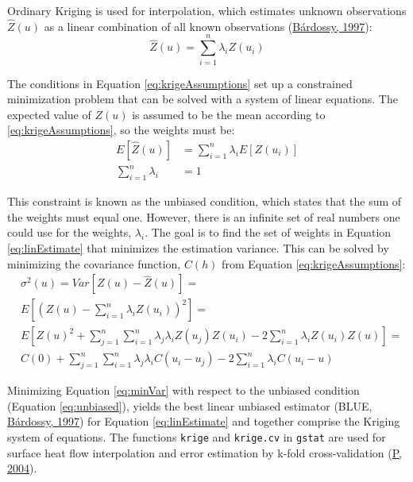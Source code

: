 Ordinary Kriging is used for interpolation, which estimates unknown observations \(\hat{Z}(u)\) as a linear combination of all known observations (\protect\hyperlink{ref-bardossy1997}{Bárdossy, 1997}):
\begin{equation}
  \hat{Z}(u) = \sum_{i=1}^n \lambda_i Z(u_i)
  \label{eq:linEstimate}
\end{equation}

The conditions in Equation \eqref{eq:krigeAssumptions} set up a constrained minimization problem that can be solved with a system of linear equations. The expected value of \(Z(u)\) is assumed to be the mean according to \eqref{eq:krigeAssumptions}, so the weights must be:
\begin{equation}
  \begin{aligned}
    E[\hat{Z}(u)] &= \sum_{i=1}^n \lambda_i E[Z(u_i)] \\
    \sum_{i=1}^n \lambda_i &= 1
  \end{aligned}
  \label{eq:unbiased}
\end{equation}

This constraint is known as the unbiased condition, which states that the sum of the weights must equal one. However, there is an infinite set of real numbers one could use for the weights, \(\lambda_i\). The goal is to find the set of weights in Equation \eqref{eq:linEstimate} that minimizes the estimation variance. This can be solved by minimizing the covariance function, \(C(h)\) from Equation \eqref{eq:krigeAssumptions}:
\begin{equation}
  \begin{aligned}
    & \sigma^2(u) = Var[Z(u) - \hat{Z}(u)] = \\
    & E\left[(Z(u) - \sum_{i=1}^n \lambda_i Z(u_i))^2\right] = \\
    & E\left[Z(u)^2 + \sum_{j=1}^n \sum_{i=1}^n \lambda_j \lambda_i Z(u_j)Z(u_i) - 2 \sum_{i=1}^n \lambda_i Z(u_i)Z(u)\right] = \\
    & C(0) + \sum_{j=1}^n \sum_{i=1}^n \lambda_j \lambda_i C(u_i - u_j) - 2 \sum_{i=1}^n \lambda_i C(u_i - u)
  \end{aligned}
  \label{eq:minVar}
\end{equation}

Minimizing Equation \eqref{eq:minVar} with respect to the unbiased condition (Equation \eqref{eq:unbiased}), yields the best linear unbiased estimator (BLUE, \protect\hyperlink{ref-bardossy1997}{Bárdossy, 1997}) for Equation \eqref{eq:linEstimate} and together comprise the Kriging system of equations. The functions \texttt{krige} and \texttt{krige.cv} in \texttt{gstat} are used for surface heat flow interpolation and error estimation by k-fold cross-validation (\protect\hyperlink{ref-pebesma2004}{P, 2004}).

